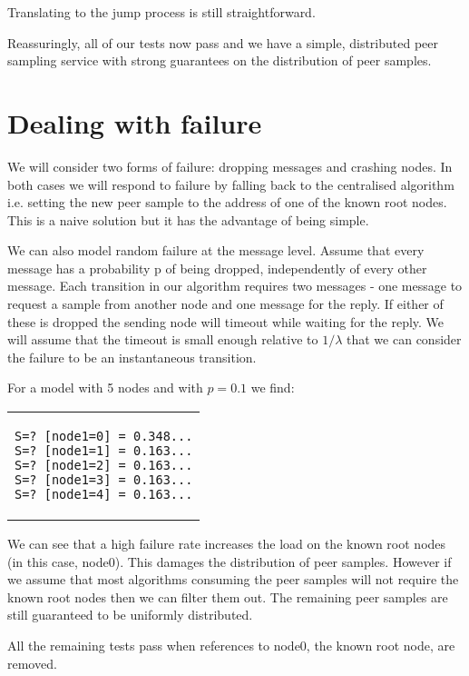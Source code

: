 \documentclass[a4paper,10pt]{article}
\newcommand{\code}[1]{
  \footnotesize
  
}
\newcommand{\prismmodel}[1]{
  \begin{quotation}
  \code{../models/#1.sm}
  \end{quotation}
}
\newenvironment{prismprop}[0]{
  \begin{center}
  \begin{tabular}{c}
  \footnotesize
}{
  \end{tabular}
  \end{center}
}
\begin{document}
Translating to the jump process is still straightforward.

\prismmodel{dtmc_full}

Reassuringly, all of our tests now pass and we have a simple, distributed peer sampling service with strong guarantees on the distribution of peer samples.

\section{Dealing with failure}

We will consider two forms of failure: dropping messages and crashing nodes. In both cases we will respond to failure by falling back to the centralised algorithm i.e. setting the new peer sample to the address of one of the known root nodes. This is a naive solution but it has the advantage of being simple. 

We can also model random failure at the message level. Assume that every message has a probability p of being dropped, independently of every other message. Each transition in our algorithm requires two messages - one message to request a sample from another node and one message for the reply. If either of these is dropped the sending node will timeout while waiting for the reply. We will assume that the timeout is small enough relative to $1/\lambda$ that we can consider the failure to be an instantaneous transition.

\prismmodel{ctmc_full_error}

For a model with 5 nodes and with $p=0.1$ we find:

\begin{prismprop}
\begin{lstlisting}
S=? [node1=0] = 0.348...
S=? [node1=1] = 0.163...
S=? [node1=2] = 0.163...
S=? [node1=3] = 0.163...
S=? [node1=4] = 0.163...
\end{lstlisting}
\end{prismprop}

We can see that a high failure rate increases the load on the known root nodes (in this case, node0). This damages the distribution of peer samples. However if we assume that most algorithms consuming the peer samples will not require the known root nodes then we can filter them out. The remaining peer samples are still guaranteed to be uniformly distributed.

All the remaining tests pass when references to node0, the known root node, are removed.
\end{document}
